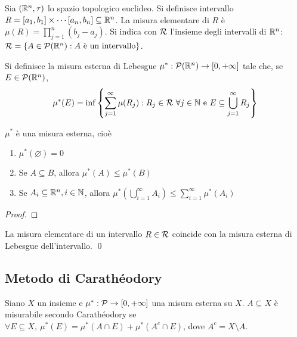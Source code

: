 \begin{definition}
	[Intervallo]
	Sia $(\mathbb{R}^n,\tau)$ lo spazio topologico euclideo. Si definisce intervallo $R=[a_1,b_1]\times\cdots[a_n,b_n] \subseteq \mathbb{R}^n$. La misura elementare di $R$ è $\mu(R)=\prod\limits_{j=1}^n(b_j-a_j)$. Si indica con $\mathcal{R}$ l'insieme degli intervalli di $\mathbb{R}^n$: $\mathcal{R}=\{A \in \mathcal{P}(\mathbb{R}^n):A \text{ è un intervallo}\}$.
\end{definition}

\begin{definition}
	Si definisce la misura esterna di Lebesgue $\mu^*:\mathcal{P}(\mathbb{R}^n)\to [0,+\infty]$ tale che, se $E \in \mathcal{P}(\mathbb{R}^n)$,
	$$
		\mu^*(E)=\inf \left\{\sum\limits_{j=1}^\infty \mu(R_j):R_j \in \mathcal{R} \ \forall j \in \mathbb{N} \text{ e } E \subseteq \bigcup\limits_{j=1}^\infty R_j\right\}
	$$
\end{definition}

\begin{theorem}
	$\mu^*$ è una misura esterna, cioè
	\begin{enumerate}
		\item $\mu^*(\varnothing)=0$
		\item Se $A \subseteq B$, allora $\mu^*(A)\leq \mu^*(B)$
		\item Se $A_i \subseteq \mathbb{R}^n, i \in \mathbb{N}$, allora $\mu^*\left(\bigcup\limits_{i=1}^\infty A_i\right)\leq \sum\limits_{i=1}^\infty \mu^*(A_i)$
	\end{enumerate}
\end{theorem}

\begin{proof}
\end{proof}

\begin{prop}
	La misura elementare di un intervallo $R \in \mathcal{R}$ coincide con la misura esterna di Lebesgue dell'intervallo.
	\qed
\end{prop}

\subsection{Metodo di Carathéodory}

\begin{definition}
	Siano $X$ un insieme e $\mu^*:\mathcal{P} \to [0,+\infty]$ una misura esterna su $X$. $A\subseteq X$ è misurabile secondo Carathéodory se $\forall E \subseteq X, \ \mu^*(E)=\mu^*(A\cap E) + \mu^*(A^c \cap E)$, dove $A^c=X\setminus A$.
\end{definition}

